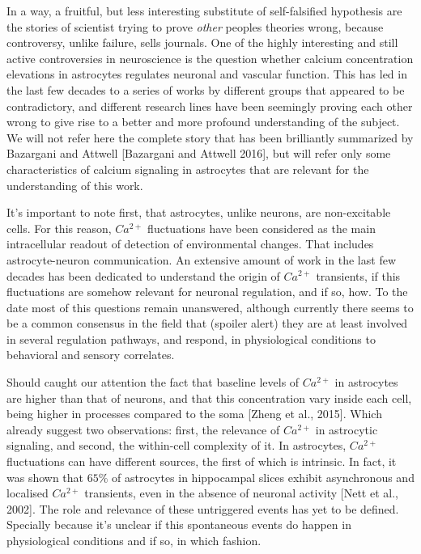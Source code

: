 In a way, a fruitful, but less interesting substitute of self-falsified hypothesis are the stories of scientist trying to prove \textit{other} peoples theories wrong, because controversy, unlike failure, sells journals.
One of the highly interesting and still active controversies in neuroscience is the question whether calcium concentration elevations in astrocytes regulates neuronal and vascular function.
This has led in the last few decades to a series of works by different groups that appeared to be contradictory, and different research lines have been seemingly proving each other wrong to give rise to a better and more profound understanding of the subject.  
We will not refer here the complete story that has been brilliantly summarized by Bazargani and Attwell [Bazargani and Attwell 2016], but will refer only some characteristics of calcium signaling in astrocytes that are relevant for the understanding of this work.

It's important to note first, that astrocytes, unlike neurons, are non-excitable cells.
For this reason, $Ca^{2+}$ fluctuations have been considered as the main intracellular readout of detection of environmental changes.
That includes astrocyte-neuron communication. 
An extensive amount of work in the last few decades has been dedicated to understand the origin of $Ca^{2+}$ transients, if this fluctuations are somehow relevant for neuronal regulation, and if so, how.
To the date most of this questions remain unanswered, although currently there seems to be a common consensus in the field that (spoiler alert) they are at least involved in several regulation pathways, and respond, in physiological conditions to behavioral and sensory correlates. 

Should caught our attention the fact that baseline levels of $Ca^{2+}$ in astrocytes are higher than that of neurons, and that this concentration vary inside each cell, being higher in processes compared to the soma [Zheng et al., 2015].
Which already suggest two observations: first, the relevance of $Ca^{2+}$ in astrocytic signaling, and second, the within-cell complexity of it. 
In astrocytes, $Ca^{2+}$ fluctuations can have different sources, the first of which is intrinsic. 
In fact, it was shown that $65\%$ of astrocytes in hippocampal slices exhibit asynchronous and localised $Ca^{2+}$ transients, even in the absence of neuronal activity [Nett et al., 2002].
The role and relevance of these untriggered events has yet to be defined. 
Specially because it's unclear if this spontaneous events do happen in physiological conditions and if so, in which fashion. 

